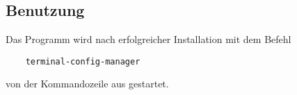 \subsection{Benutzung} \label{Benutzung}
Das Programm wird nach erfolgreicher Installation mit dem Befehl

\begin{verbatim}
    terminal-config-manager
\end{verbatim}

von der Kommandozeile aus gestartet.